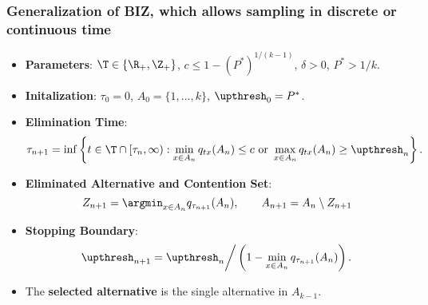 {\begin{frame}
  \frametitle{Generalization of BIZ, which allows sampling in discrete or continuous time} 
  \begin{itemize}
    \item {\bf Parameters}: $\T \in \{\R_+,\Z_+\}$, $c \le 1 - (P^*)^{1/(k-1)}$, $\delta>0$, $P^*>1/k$.
    \item {\bf Initalization}: $\tau_0 = 0$, $A_0=\{1,\ldots,k\}$, $\upthresh_0 = P^*$.
\item {\bf Elimination Time}: 
  \begin{multline*}
  \tau_{n+1} = \inf\left\{ t \in \T \cap [\tau_n,\infty) : 
  \min_{x\in A_n} q_{tx}(A_n) \le c 
  \text{ or } 
  \max_{x\in A_n} q_{tx}(A_n) \ge \upthresh_n \right\}.
  \end{multline*}
\item {\bf Eliminated Alternative and Contention Set}:
  \begin{equation*}
    Z_{n+1} = \argmin_{x\in A_n} q_{\tau_{n+1}}(A_n), \qquad
    A_{n+1} = A_n \setminus Z_{n+1}
  \end{equation*}
\item {\bf Stopping Boundary}: 
  \begin{equation*}
    \upthresh_{n+1} = \upthresh_n \bigg/ \left(1 - \min_{x\in A_n} q_{\tau_{n+1}}(A_n)\right).
  \end{equation*}
\item The {\bf selected alternative} is the single alternative in $A_{k-1}$.
\end{itemize}
\end{frame}




}
